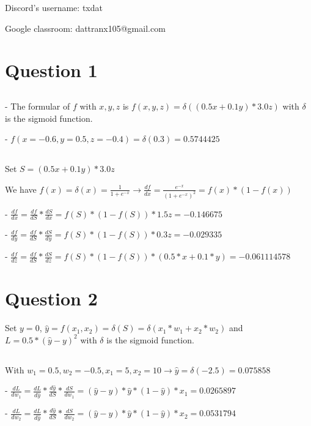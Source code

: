 \documentclass[10pt]{article}
\begin{document}
Discord's username: txdat

Google classroom: dattranx105@gmail.com

\section{Question 1}

\subsection{}

- The formular of $f$ with $x, y, z$ is $f(x,y,z) = \delta((0.5x+0.1y)*3.0z)$ with $\delta$ is the sigmoid function.

- $f(x=-0.6,y=0.5,z=-0.4) = \delta(0.3) = 0.5744425 $

\subsection{}

Set $S = (0.5x + 0.1y) * 3.0z$

We have $f(x)=\delta(x)=\frac{1}{1 + e^{-x}} \rightarrow \frac{df}{dx}=\frac{e^{-x}}{(1 + e^{-x})^2} = f(x)*(1 - f(x))$

- $\frac{df}{dx} = \frac{df}{dS}*\frac{dS}{dx} = f(S)*(1 - f(S))*1.5z = -0.146675$

- $\frac{df}{dy} = \frac{df}{dS}*\frac{dS}{dy} = f(S)*(1 - f(S))*0.3z = -0.029335$

- $\frac{df}{dz} = \frac{df}{dS}*\frac{dS}{dz} = f(S)*(1 - f(S))*(0.5*x+0.1*y) = -0.061114578$

\section{Question 2}

Set $y = 0$, $\hat{y}=f(x_1,x_2)=\delta(S)=\delta(x_1*w_1+x_2*w_2)$ and $L = 0.5*(\hat{y} - y)^2$ with $\delta$ is the sigmoid function.

\subsection{}

With $w_1 = 0.5, w_2 = -0.5, x_1 = 5, x_2 = 10 \rightarrow \hat{y} = \delta(-2.5) = 0.075858$

- $\frac{dL}{dw_1} = \frac{dL}{d\hat{y}}*\frac{d\hat{y}}{dS}*\frac{dS}{dw_1} = (\hat{y} - y)*\hat{y}*(1 - \hat{y})*x_1 = 0.0265897$

- $\frac{dL}{dw_2} = \frac{dL}{d\hat{y}}*\frac{d\hat{y}}{dS}*\frac{dS}{dw_2} = (\hat{y} - y)*\hat{y}*(1 - \hat{y})*x_2 = 0.0531794$
\end{document}
